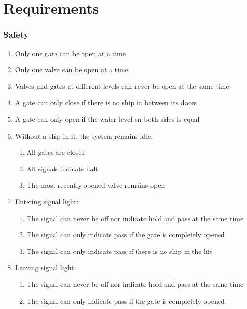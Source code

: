 \section{Requirements}
\subsubsection*{Safety}
\begin{enumerate}
	\item Only one gate can be open at a time
	\item Only one valve can be open at a time
	\item Valves and gates at different levels can never be open at the same time
	\item A gate can only close if there is no ship in between its doors
	\item A gate can only open if the water level on both sides is equal
	\item Without a ship in it, the system remains idle:
	\begin{enumerate}
		\item All gates are closed
		\item All signals indicate halt
		\item The most recently opened valve remains open
	\end{enumerate}
	\item Entering signal light:
	\begin{enumerate}
		\item The signal can never be off nor indicate hold and pass at the same time
		\item The signal can only indicate pass if the gate is completely opened
		\item The signal can only indicate pass if there is no ship in the lift
	\end{enumerate}
	\item Leaving signal light:
	\begin{enumerate}
		\item The signal can never be off nor indicate hold and pass at the same time
		\item The signal can only indicate pass if the gate is completely opened
	\end{enumerate}
\end{enumerate}
	
